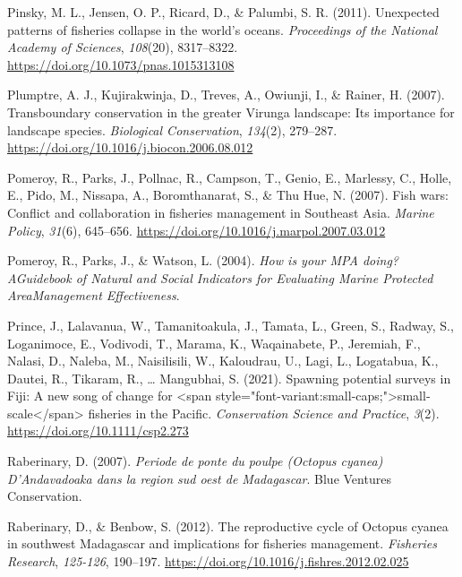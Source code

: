 \documentclass[
  12pt,
]{article}
\newlength{\cslhangindent}
\newlength{\cslentryspacingunit} %
\newenvironment{CSLReferences}[2] %
 {%
  \setlength{\parindent}{0pt}
  \ifodd #1
  \let\oldpar\par
  \def\par{\hangindent=\cslhangindent\oldpar}
  \fi
  \setlength{\parskip}{#2\cslentryspacingunit}
 }%
 {}
\begin{document}
\begin{CSLReferences}{1}{2}
\leavevmode{}%
Pinsky, M. L., Jensen, O. P., Ricard, D., \& Palumbi, S. R. (2011). Unexpected patterns of fisheries collapse in the world's oceans. \emph{Proceedings of the National Academy of Sciences}, \emph{108}(20), 8317--8322. \url{https://doi.org/10.1073/pnas.1015313108}

\leavevmode{}%
Plumptre, A. J., Kujirakwinja, D., Treves, A., Owiunji, I., \& Rainer, H. (2007). Transboundary conservation in the greater {Virunga} landscape: {Its} importance for landscape species. \emph{Biological Conservation}, \emph{134}(2), 279--287. \url{https://doi.org/10.1016/j.biocon.2006.08.012}

\leavevmode{}%
Pomeroy, R., Parks, J., Pollnac, R., Campson, T., Genio, E., Marlessy, C., Holle, E., Pido, M., Nissapa, A., Boromthanarat, S., \& Thu Hue, N. (2007). Fish wars: {Conflict} and collaboration in fisheries management in {Southeast} {Asia}. \emph{Marine Policy}, \emph{31}(6), 645--656. \url{https://doi.org/10.1016/j.marpol.2007.03.012}

\leavevmode{}%
Pomeroy, R., Parks, J., \& Watson, L. (2004). \emph{How is your {MPA} doing? {AGuidebook} of {Natural} and {Social} {Indicators} for {Evaluating} {Marine} {Protected} {AreaManagement} {Effectiveness}}.

\leavevmode{}%
Prince, J., Lalavanua, W., Tamanitoakula, J., Tamata, L., Green, S., Radway, S., Loganimoce, E., Vodivodi, T., Marama, K., Waqainabete, P., Jeremiah, F., Nalasi, D., Naleba, M., Naisilisili, W., Kaloudrau, U., Lagi, L., Logatabua, K., Dautei, R., Tikaram, R., \ldots{} Mangubhai, S. (2021). Spawning potential surveys in {Fiji}: {A} new song of change for {\textless{}}span style="font-variant:small-caps;"{\textgreater{}}small‐scale{\textless{}}/span{\textgreater{}} fisheries in the {Pacific}. \emph{Conservation Science and Practice}, \emph{3}(2). \url{https://doi.org/10.1111/csp2.273}

\leavevmode{}%
Raberinary, D. (2007). \emph{Periode de ponte du poulpe ({Octopus} cyanea) {D}'{Andavadoaka} dans la region sud oest de {Madagascar}}. Blue Ventures Conservation.

\leavevmode{}%
Raberinary, D., \& Benbow, S. (2012). The reproductive cycle of {Octopus} cyanea in southwest {Madagascar} and implications for fisheries management. \emph{Fisheries Research}, \emph{125-126}, 190--197. \url{https://doi.org/10.1016/j.fishres.2012.02.025}


\end{CSLReferences}
\end{document}
